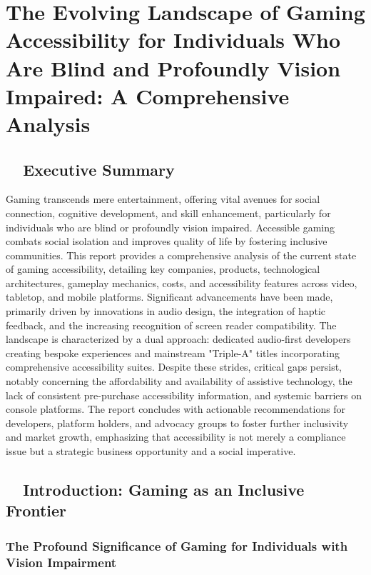 \chapter{The Evolving Landscape of Gaming Accessibility for Individuals Who Are Blind and Profoundly Vision Impaired: A Comprehensive Analysis}


\section{~~Executive Summary}

Gaming transcends mere entertainment, offering vital avenues for social connection, cognitive development, and skill enhancement, particularly for individuals who are blind or profoundly vision impaired. Accessible gaming combats social isolation and improves quality of life by fostering inclusive communities\supercite{AbleGamers2025}. This report provides a comprehensive analysis of the current state of gaming accessibility, detailing key companies, products, technological architectures, gameplay mechanics, costs, and accessibility features across video, tabletop, and mobile platforms. Significant advancements have been made, primarily driven by innovations in audio design, the integration of haptic feedback, and the increasing recognition of screen reader compatibility. The landscape is characterized by a dual approach: dedicated audio-first developers creating bespoke experiences and mainstream "Triple-A" titles incorporating comprehensive accessibility suites. Despite these strides, critical gaps persist, notably concerning the affordability and availability of assistive technology, the lack of consistent pre-purchase accessibility information, and systemic barriers on console platforms. The report concludes with actionable recommendations for developers, platform holders, and advocacy groups to foster further inclusivity and market growth, emphasizing that accessibility is not merely a compliance issue but a strategic business opportunity and a social imperative.

\section{~~Introduction: Gaming as an Inclusive Frontier}


\subsection{The Profound Significance of Gaming for Individuals with Vision Impairment}

